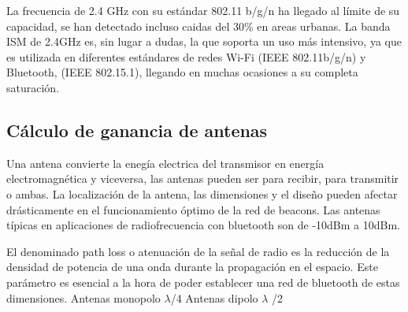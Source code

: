 \documentclass[a4paper ,12pt, onecolumn]{article}
\begin{document}
            La frecuencia de 2.4 GHz con su estándar 802.11 b/g/n ha llegado al límite de su capacidad, se han
            detectado incluso caidas del 30\% en areas urbanas.  
            La banda ISM de 2.4GHz es, sin lugar a dudas, la que soporta un uso más intensivo, ya que es utilizada en 
            diferentes estándares de redes Wi-Fi (IEEE 802.11b/g/n) y Bluetooth, (IEEE 802.15.1), llegando en muchas 
            ocasiones a su completa saturación.
    \subsection{Cálculo de ganancia de antenas}
            Una antena convierte la enegía electrica del transmisor en energía electromagnética y viceversa, las antenas pueden ser 
            para recibir, para transmitir o ambas. La localización de la antena, las dimensiones y el diseño pueden afectar drásticamente
            en el funcionamiento óptimo de la red de beacons. 
            Las antenas típicas en aplicaciones de radiofrecuencia con bluetooth son de -10dBm a 10dBm.

            El denominado path loss o atenuación de la señal de radio es la reducción de la densidad de potencia de una onda durante la 
            propagación en el espacio. Este parámetro es esencial a la hora de poder establecer una red de bluetooth de estas dimensiones.
            Antenas monopolo $\lambda$/4
            Antenas dipolo $\lambda$ /2 
\end{document}
